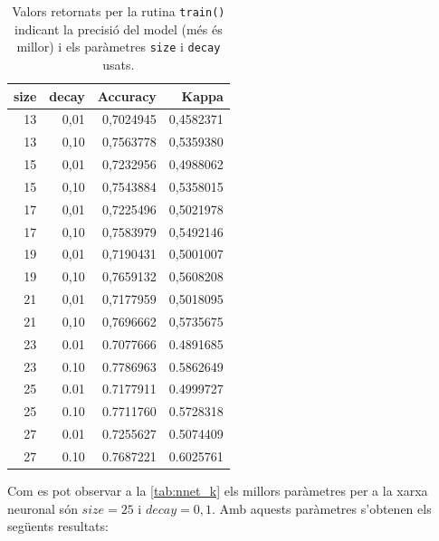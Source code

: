 \documentclass[a4paper]{article}
\begin{document}
\begin{table}[H]
	\centering
	\def\arraystretch{1.2}
	\begin{tabular}{|rrrr|}
		\hline
		size & decay & Accuracy & Kappa \\
		\hline
		13 & 0,01 & 0,7024945 & 0,4582371 \\
		13 & 0,10 & 0,7563778 & 0,5359380 \\
		15 & 0,01 & 0,7232956 & 0,4988062 \\
		15 & 0,10 & 0,7543884 & 0,5358015 \\
		17 & 0,01 & 0,7225496 & 0,5021978 \\
		17 & 0,10 & 0,7583979 & 0,5492146 \\
		19 & 0,01 & 0,7190431 & 0,5001007 \\
		19 & 0,10 & 0,7659132 & 0,5608208 \\
		21 & 0,01 & 0,7177959 & 0,5018095 \\
		21 & 0,10 & 0,7696662 & 0,5735675 \\
		23 & 0.01 & 0.7077666 & 0.4891685 \\
		23 & 0.10 & 0.7786963 & 0.5862649 \\
		25 & 0.01 & 0.7177911 & 0.4999727 \\
		\rowcolor{Orange!40}
		25 & 0.10 & 0.7711760 & 0.5728318 \\
		27 & 0.01 & 0.7255627 & 0.5074409 \\
		27 & 0.10 & 0.7687221 & 0.6025761 \\
		\hline
	\end{tabular}
	\captionsetup{width=0.6\textwidth}
	\caption{Valors retornats per la rutina \texttt{train()} indicant la precisió del model (més és millor) i els paràmetres \texttt{size} i \texttt{decay} usats.}
	\label{tab:nnet_k}
\end{table}

Com es pot observar a la \autoref{tab:nnet_k} els millors paràmetres per a la xarxa neuronal són $size = 25$ i $decay = 0,1$. Amb aquests paràmetres s'obtenen els següents resultats:
\end{document}
